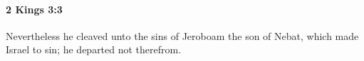 
		\paragraph{2 Kings 3:3} %
			\label{2KINGS-3-3}

			Nevertheless he cleaved unto the sins of Jeroboam the son of Nebat, which made Israel to sin; he departed not therefrom.


